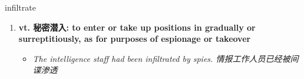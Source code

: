 
\begin{frame}
{\huge infiltrate}
\begin{center}
\begin{enumerate}\Large
  \item \textbf{vt. 秘密潜入: to enter or take up positions in gradually or surreptitiously, as for purposes of espionage or takeover}
  \begin{itemize}
    \item \em{\Large{The intelligence staff had been infiltrated by spies. 情报工作人员已经被间谍渗透}}
  \end{itemize}
\end{enumerate}
\end{center}
\end{frame}
